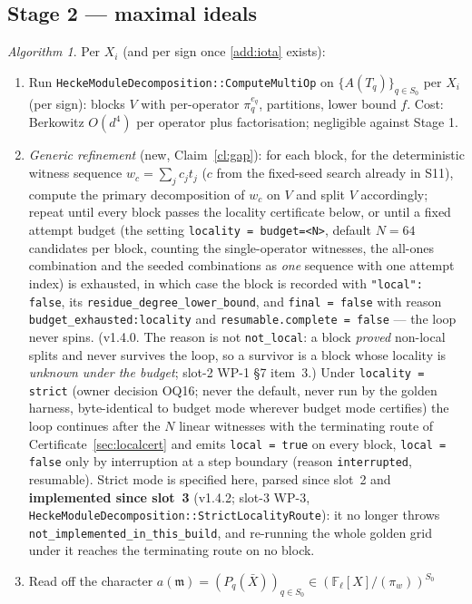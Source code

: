 \documentclass[11pt]{article}
\theoremstyle{remark}
\newtheorem{algorithm}[theorem]{Algorithm}
\newcommand{\F}{\mathbb{F}}
\newcommand{\Fl}{\F_\ell}
\newcommand{\m}{\mathfrak{m}}
\begin{document}
\subsection*{Stage 2 --- maximal ideals}
\begin{algorithm}\label{alg:stage2}
Per $X_i$ (and per sign once \ref{add:iota} exists):
\begin{enumerate}
\item Run \texttt{HeckeModuleDecomposition::ComputeMultiOp} on $\{A(T_q)\}_{q\in S_0}$ per
  $X_i$ (per sign): blocks $V$ with per-operator $\pi_q^{e_q}$, partitions, lower bound $f$.
  Cost: Berkowitz $O(d^4)$ per operator plus factorisation; negligible against Stage 1.
\item \emph{Generic refinement} (new, Claim~\ref{cl:gap}): for each block, for the
  deterministic witness sequence $w_c=\sum_jc_jt_j$ ($c$ from the fixed-seed search already in
  S11), compute the primary decomposition of $w_c$ on $V$ and split $V$ accordingly; repeat
  until every block passes the locality certificate below, or until a fixed attempt budget
  (the setting \texttt{locality = budget=<N>}, default $N=64$ candidates per block, counting
  the single-operator witnesses, the all-ones combination and the seeded combinations as
  \emph{one} sequence with one attempt index) is exhausted, in which case the block is recorded
  with \texttt{"local": false}, its \texttt{residue\_degree\_lower\_bound}, and
  \texttt{final = false} with reason \texttt{budget\_exhausted:locality} and
  \texttt{resumable.complete = false} --- the loop never spins. (v1.4.0. The reason is not
  \texttt{not\_local}: a block \emph{proved} non-local splits and never survives the loop, so a
  survivor is a block whose locality is \emph{unknown under the budget}; slot-2 WP-1 \S7
  item~3.) Under \texttt{locality = strict} (owner decision OQ16; never the default, never run
  by the golden harness, byte-identical to budget mode wherever budget mode certifies) the loop
  continues after the $N$ linear witnesses with the terminating route of
  Certificate~\ref{sec:localcert} and emits \texttt{local = true} on every block,
  \texttt{local = false} only by interruption at a step boundary (reason \texttt{interrupted},
  resumable). Strict mode is specified here, parsed since slot~2 and \textbf{implemented
  since slot~3} (v1.4.2; slot-3 WP-3, \texttt{HeckeModuleDecomposition::StrictLocalityRoute}):
  it no longer throws \texttt{not\_implemented\_in\_this\_build}, and re-running the whole
  golden grid under it reaches the terminating route on no block.
\item Read off the character $a(\m)=(P_q(\bar X))_{q\in S_0}\in(\Fl[X]/(\pi_w))^{S_0}$

\end{enumerate}
\end{algorithm}
\end{document}
